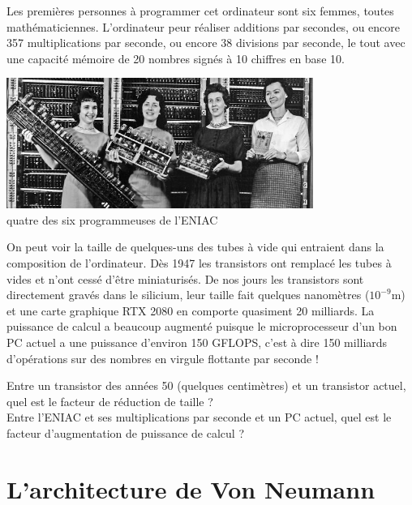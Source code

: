 \documentclass[a4paper,12pt,french]{book}
\begin{document}
Les premières personnes à programmer cet ordinateur sont six femmes, toutes mathématiciennes. L'ordinateur peur réaliser  additions par secondes, ou encore 357 multiplications par seconde, ou encore 38 divisions par seconde, le tout avec une capacité mémoire de 20 nombres signés à 10 chiffres en base 10.
\begin{center}
	\includegraphics[width=10cm]{eniac.jpg}\\ \footnotesize quatre des six programmeuses de l'ENIAC
\end{center}
On peut voir la taille de quelques-uns des  tubes à vide qui entraient dans la composition de l'ordinateur. Dès 1947 les transistors ont remplacé les tubes à vides et n'ont cessé d'être miniaturisés. De nos jours les transistors sont directement gravés dans le silicium, leur taille fait quelques nanomètres ($10^{-9}$m) et une carte graphique RTX 2080 en comporte quasiment 20 milliards. La puissance de calcul a beaucoup augmenté puisque le microprocesseur d'un bon PC actuel a une puissance d'environ 150 GFLOPS,  c'est à dire 150 milliards d'opérations sur des nombres en virgule flottante par seconde !

\begin{exercice}[]
	Entre un transistor des années 50 (quelques centimètres) et un transistor actuel, quel est le facteur de réduction de taille ?\\
	Entre l'ENIAC et ses multiplications par seconde et un PC actuel, quel est le facteur d'augmentation de puissance de calcul ?
\end{exercice}

\section{L'architecture de Von Neumann}
\end{document}

